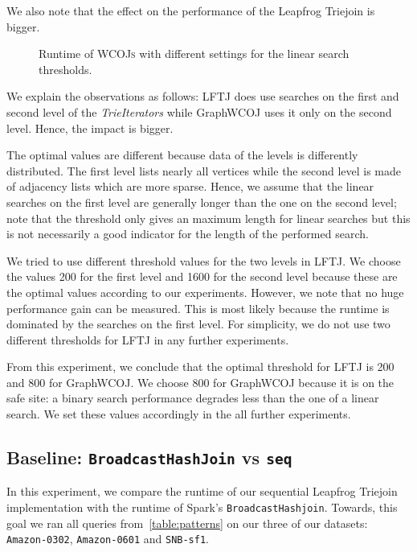 We also note that the effect on the performance of the Leapfrog Triejoin is bigger.

\begin{figure}
    \centering
    \caption{Runtime of \textsc{WCOJs} with different settings for the linear search thresholds.}
\end{figure}

We explain the observations as follows: \textsc{LFTJ} does use searches on the first
and second level of the \textit{TrieIterators} while GraphWCOJ uses it only on the second
level.
Hence, the impact is bigger.

The optimal values are different because data of the levels is differently distributed.
The first level lists nearly all vertices while the second level is made of adjacency lists which are more
sparse.
Hence, we assume that the linear searches on the first level are generally longer than
the one on the second level;
note that the threshold only gives an maximum length for linear searches but this is not
necessarily a good indicator for the length of the performed search.

We tried to use different threshold values for the two levels in \textsc{LFTJ}.
We choose the values 200 for the first level and 1600 for the second level because these
are the optimal values according to our experiments.
However, we note that no huge performance gain can be measured.
This is most likely because the runtime is dominated by the searches on the first level.
For simplicity, we do not use two different thresholds for \textsc{LFTJ} in any further experiments.

From this experiment, we conclude that the optimal threshold for \textsc{LFTJ} is 200 and 800
for GraphWCOJ.
We choose 800 for GraphWCOJ because it is on the safe site:
a binary search performance degrades less than the one of a linear search.
We set these values accordingly in the all further experiments.


\subsection{Baseline: \texttt{BroadcastHashJoin} vs \texttt{seq}}
In this experiment, we compare the runtime of our sequential Leapfrog Triejoin implementation with the runtime of Spark's \texttt{BroadcastHashjoin}.
Towards, this goal we ran all queries from~\cref{table:patterns} on our three of our datasets: \texttt{Amazon-0302}, \texttt{Amazon-0601}
and
\texttt{SNB-sf1}.


